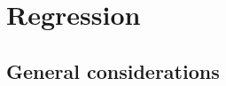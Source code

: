 \chapter{Regression}
\label{ch:capitolo4}


\section{General considerations}\label{sec:general_considerations}
